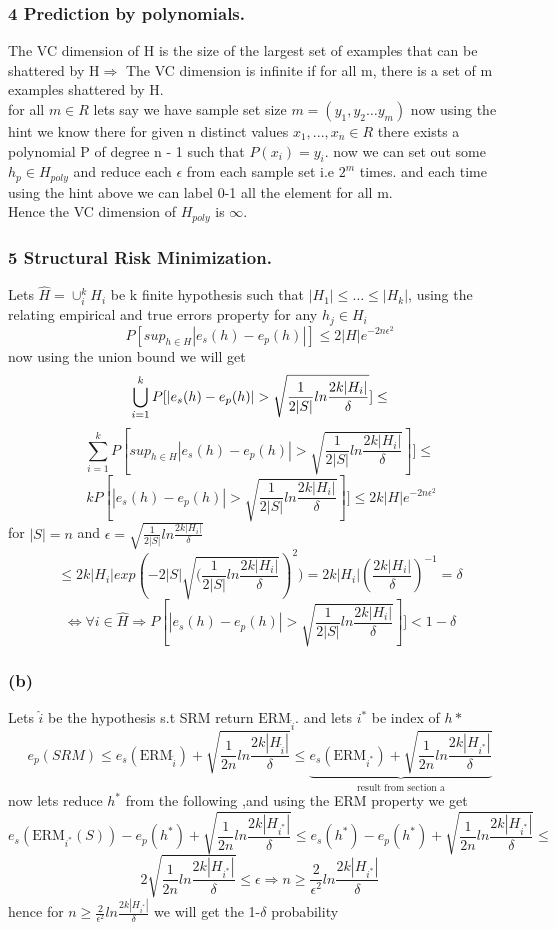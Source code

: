\documentclass[12pt]{article}
\theoremstyle{plain}
\newcommand{\wbigcup}{\mathop{{\bigcup}}\displaylimits}
\begin{document}
  \subsubsection*{ 4 Prediction by polynomials.}
 The VC dimension of H is the size of the largest set of examples that can be shattered by H$\Rightarrow$ The VC dimension is infinite if for all m, there is a set of m examples shattered by H.\\ 
for all $m \in R$ lets say we have sample set size $m=(y_1,y_2\dots y_m)
$ now using the hint we know there for given n distinct values $x_1, ..., x_n\in R$  there exists a polynomial
P of degree n - 1 such that $P(x_i) = y_i$. now we can set out some $h_p \in H_{poly}$ and reduce each $\epsilon$ from each sample set i.e $2^m$ times. and each time using the hint above we can label 0-1 all the element for all m.
\\Hence the VC dimension  of $H_{poly}$ is $\infty$.
  \subsubsection*{ 5 Structural Risk Minimization.}
Lets $\hat{H}=\cup^k_iH_i$ be k finite hypothesis such that $|H_1| \leq \dots \leq |H_k|$, using the relating empirical and true errors property
 for any  $h_j \in H_i$
\[P[{sup}_{h\in H}|e_s(h)-e_p(h)|]\leq2|H|e^{-2n\epsilon^2}
\]
 now using the union bound we will get
\[
\wbigcup^k_{i=1} P[|e_s(h)-e_p(h)|>\sqrt{\frac{1}{2|S|}ln\frac{2k|H_i|}{\delta}}]\leq 
\]
\[
\sum^k_{i=1} P[{sup}_{h\in H}|e_s(h)-e_p(h)|>\sqrt{\frac{1}{2|S|}ln\frac{2k|H_i|}{\delta}}]] \leq
\]
\[
\ k P[|e_s(h)-e_p(h)|>\sqrt{\frac{1}{2|S|}ln\frac{2k|H_i|}{\delta}}]] \leq 2k|H|e^{-2n\epsilon^2}
\]
for $|S|=n$ and $\epsilon = \sqrt{\frac{1}{2|S|}ln\frac{2k|H_i|}{\delta}}$
\[
\leq 2k|H_i|exp(-2|S|\sqrt{(\frac{1}{2|S|}ln\frac{2k|H_i|}{\delta}})^2)=2k|H_i|(\frac{2k|H_i|}{\delta})^{-1}=\delta
\]
\[
\Leftrightarrow \forall i \in \hat{H} \Rightarrow P[|e_s(h)-e_p(h)|>\sqrt{\frac{1}{2|S|}ln\frac{2k|H_i|}{\delta}}]] < 1-\delta
\]
\subsubsection*{(b)}
Lets $\hat{i}$ be the hypothesis s.t SRM return $\text{ERM}_{\hat{i}}$. and lets $i^*$ be index of $h*$
\[
e_p(SRM)\leq e_s(\text{ERM}_{\hat{i}})+\sqrt{\frac{1}{2n}ln\frac{2k|H_{\hat{i}}|}{\delta}}\leq \underbrace{e_s(\text{ERM}_{i^*})+\sqrt{\frac{1}{2n}ln\frac{2k|H_{i^*}|}{\delta}}}_{\text{result from section a}} 
\]
now lets reduce $h^*$ from the following ,and using the ERM property we get
\[
e_s(\text{ERM}_{i^*}(S))-e_p(h^*)+\sqrt{\frac{1}{2n}ln\frac{2k|H_{i^*}|}{\delta}}\leq e_s(h^*)-e_p(h^*)+\sqrt{\frac{1}{2n}ln\frac{2k|H_{i^*}|}{\delta}}\leq
\]
\[ 2\sqrt{\frac{1}{2n}ln\frac{2k|H_{i^*}|}{\delta}}\leq \epsilon\Rightarrow n\geq \frac{2}{\epsilon^2}ln\frac{2k|H_{i^*}|}{\delta}
\]
hence for  $n\geq \frac{2}{\epsilon^2}ln\frac{2k|H_{i^*}|}{\delta}$ we will get the 1-$\delta$ probability
\end{document}
